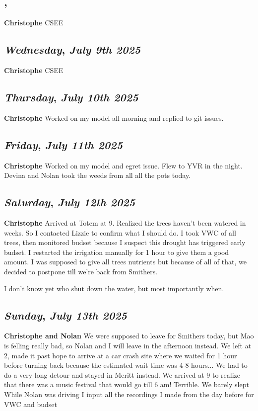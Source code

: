 \subsection*{\weekday, \day}
\textbf {Christophe}
CSEE

\def\day{\textit{July 9th 2025}}
\def\weekday{\textit{Wednesday}}
\subsection*{\weekday, \day}
\textbf {Christophe}
CSEE

\def\day{\textit{July 10th 2025}}
\def\weekday{\textit{Thursday}}
\subsection*{\weekday, \day}
\textbf {Christophe}
Worked on my model all morning and replied to git issues. 

\def\day{\textit{July 11th 2025}}
\def\weekday{\textit{Friday}}
\subsection*{\weekday, \day}
\textbf {Christophe}
Worked on my model and egret issue. Flew to YVR in the night. Devina and Nolan took the weeds from all all the pots today.

\def\day{\textit{July 12th 2025}}
\def\weekday{\textit{Saturday}}
\subsection*{\weekday, \day}
\textbf {Christophe}
Arrived at Totem at 9. Realized the trees haven't been watered in weeks. So I contacted Lizzie to confirm what I should do. I took VWC of all trees, then monitored budset because I suspect this drought has triggered early budset. I restarted the irrigation manually for 1 hour to give them a good amount. I was supposed to give all trees nutrients but because of all of that, we decided to postpone till we're back from Smithers.

I don't know yet who shut down the water, but most importantly when.

\def\day{\textit{July 13th 2025}}
\def\weekday{\textit{Sunday}}
\subsection*{\weekday, \day}
\textbf {Christophe and Nolan}
We were supposed to leave for Smithers today, but Mao is felling really bad, so Nolan and I will leave in the afternoon instead. 
We left at 2, made it past hope to arrive at a car crash site where we waited for 1 hour before turning back because the estimated wait time was 4-8 hours... We had to do a very long detour and stayed in Meritt instead. We arrived at 9 to realize that there was a music festival that would go till 6 am! Terrible. We barely slept
While Nolan was driving I input all the recordings I made from the day before for VWC and budset
\def\day{\textit{July 14th 2025}}
\def\weekday{\textit{Monday}}
